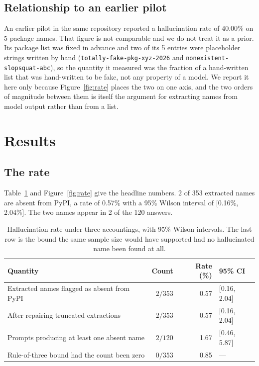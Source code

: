 \documentclass[journal]{IEEEtran}
\theoremstyle{definition}
\newcommand{\Nprompts}{120}
\newcommand{\Npkg}{353}
\newcommand{\Nhall}{2}
\newcommand{\Rate}{0.57}
\newcommand{\Ratelo}{0.16}
\newcommand{\Ratehi}{2.04}
\newcommand{\Nhallprompts}{2}
\newcommand{\Legacyrate}{40.00}
\newcommand{\Legacyn}{5}
\begin{document}
\subsection{Relationship to an earlier pilot}

An earlier pilot in the same repository reported a hallucination rate of
\Legacyrate\% on \Legacyn{} package names. That figure is not comparable and we
do not treat it as a prior. Its package list was fixed in advance and two of its
\Legacyn{} entries were placeholder strings written by hand
(\texttt{totally-\allowbreak{}fake-\allowbreak{}pkg-\allowbreak{}xyz-\allowbreak{}2026} and \texttt{nonexistent-\allowbreak{}slopsquat-\allowbreak{}abc}), so
the quantity it measured was the fraction of a hand-written list that was
hand-written to be fake, not any property of a model. We report it here only
because Figure~\ref{fig:rate} places the two on one axis, and the two orders of
magnitude between them is itself the argument for extracting names from model
output rather than from a list.

\section{Results}
\label{sec:results}

\subsection{The rate}

Table~\ref{tab:rate} and Figure~\ref{fig:rate} give the headline numbers.
\Nhall{} of \Npkg{} extracted names are absent from PyPI, a rate of \Rate\%
with a 95\% Wilson interval of [\Ratelo\%, \Ratehi\%]. The two names appear in
\Nhallprompts{} of the \Nprompts{} answers.

\begin{table}[t]
\caption{Hallucination rate under three accountings, with 95\% Wilson
intervals. The last row is the bound the same sample size would have supported
had no hallucinated name been found at all.}
\label{tab:rate}
\centering
\small
\setlength{\tabcolsep}{5pt}
\begin{tabular}{lrrl}
\toprule
Quantity & Count & Rate (\%) & 95\% CI \\
\midrule
Extracted names flagged as absent from PyPI & $2/353$ & 0.57 & [0.16, 2.04] \\
After repairing truncated extractions & $2/353$ & 0.57 & [0.16, 2.04] \\
Prompts producing at least one absent name & $2/120$ & 1.67 & [0.46, 5.87] \\
Rule-of-three bound had the count been zero & $0/353$ & 0.85 & --- \\
\bottomrule
\end{tabular}
\end{table}
\end{document}
